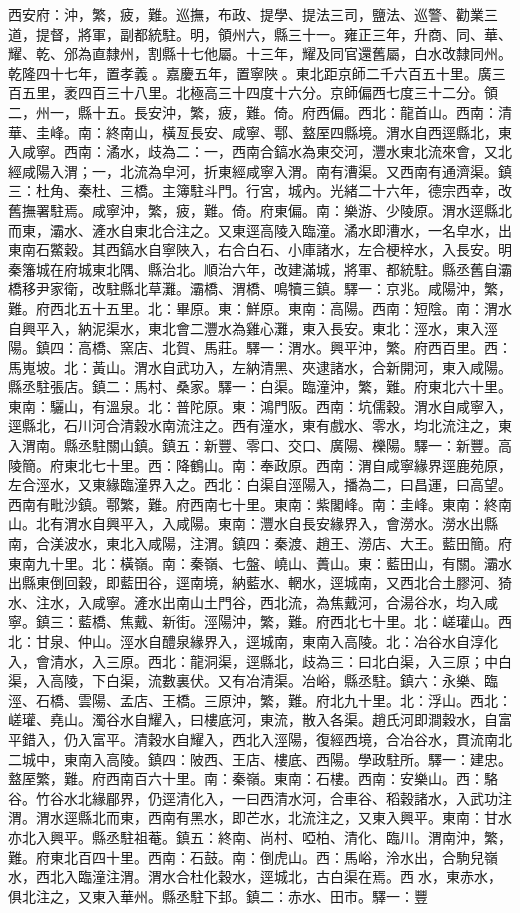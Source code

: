 \begin{pinyinscope}
西安府：沖，繁，疲，難。巡撫，布政、提學、提法三司，鹽法、巡警、勸業三道，提督，將軍，副都統駐。明，領州六，縣三十一。雍正三年，升商、同、華、耀、乾、邠為直隸州，割縣十七他屬。十三年，耀及同官還舊屬，白水改隸同州。乾隆四十七年，置孝義。嘉慶五年，置寧陜。東北距京師二千六百五十里。廣三百五里，袤四百三十八里。北極高三十四度十六分。京師偏西七度三十二分。領二，州一，縣十五。長安沖，繁，疲，難。倚。府西偏。西北：龍首山。西南：清華、圭峰。南：終南山，橫亙長安、咸寧、鄠、盩厔四縣境。渭水自西逕縣北，東入咸寧。西南：潏水，歧為二：一，西南合鎬水為東交河，灃水東北流來會，又北經咸陽入渭；一，北流為皁河，折東經咸寧入渭。南有漕渠。又西南有通濟渠。鎮三：杜角、秦杜、三橋。主簿駐斗門。行宮，城內。光緒二十六年，德宗西幸，改舊撫署駐焉。咸寧沖，繁，疲，難。倚。府東偏。南：樂游、少陵原。渭水逕縣北而東，灞水、滻水自東北合注之。又東逕高陵入臨潼。潏水即漕水，一名皁水，出東南石鱉穀。其西鎬水自寧陜入，右合白石、小庫諸水，左合梗梓水，入長安。明秦籓城在府城東北隅、縣治北。順治六年，改建滿城，將軍、都統駐。縣丞舊自灞橋移尹家衛，改駐縣北草灘。灞橋、渭橋、鳴犢三鎮。驛一：京兆。咸陽沖，繁，難。府西北五十五里。北：畢原。東：鮮原。東南：高陽。西南：短陰。南：渭水自興平入，納泥渠水，東北會二灃水為雞心灘，東入長安。東北：涇水，東入涇陽。鎮四：高橋、窯店、北賀、馬莊。驛一：渭水。興平沖，繁。府西百里。西：馬嵬坡。北：黃山。渭水自武功入，左納清黑、夾逮諸水，合新開河，東入咸陽。縣丞駐張店。鎮二：馬村、桑家。驛一：白渠。臨潼沖，繁，難。府東北六十里。東南：驪山，有溫泉。北：普陀原。東：鴻門阪。西南：坑儒穀。渭水自咸寧入，逕縣北，石川河合清穀水南流注之。西有潼水，東有戲水、零水，均北流注之，東入渭南。縣丞駐關山鎮。鎮五：新豐、零口、交口、廣陽、櫟陽。驛一：新豐。高陵簡。府東北七十里。西：降鶴山。南：奉政原。西南：渭自咸寧緣界逕鹿苑原，左合涇水，又東緣臨潼界入之。西北：白渠自涇陽入，播為二，曰昌運，曰高望。西南有毗沙鎮。鄠繁，難。府西南七十里。東南：紫閣峰。南：圭峰。東南：終南山。北有渭水自興平入，入咸陽。東南：灃水自長安緣界入，會澇水。澇水出縣南，合渼波水，東北入咸陽，注渭。鎮四：秦渡、趙王、澇店、大王。藍田簡。府東南九十里。北：橫嶺。南：秦嶺、七盤、嶢山、蕢山。東：藍田山，有關。灞水出縣東倒回穀，即藍田谷，逕南境，納藍水、輞水，逕城南，又西北合土膠河、猗水、注水，入咸寧。滻水出南山土門谷，西北流，為焦戴河，合湯谷水，均入咸寧。鎮三：藍橋、焦戴、新街。涇陽沖，繁，難。府西北七十里。北：嵯瓘山。西北：甘泉、仲山。涇水自醴泉緣界入，逕城南，東南入高陵。北：冶谷水自淳化入，會清水，入三原。西北：龍洞渠，逕縣北，歧為三：曰北白渠，入三原；中白渠，入高陵，下白渠，流數裏伏。又有冶清渠。冶峪，縣丞駐。鎮六：永樂、臨涇、石橋、雲陽、孟店、王橋。三原沖，繁，難。府北九十里。北：浮山。西北：嵯瓘、堯山。濁谷水自耀入，曰樓底河，東流，散入各渠。趙氏河即澗穀水，自富平錯入，仍入富平。清穀水自耀入，西北入涇陽，復經西境，合冶谷水，貫流南北二城中，東南入高陵。鎮四：陂西、王店、樓底、西陽。學政駐所。驛一：建忠。盩厔繁，難。府西南百六十里。南：秦嶺。東南：石樓。西南：安樂山。西：駱谷。竹谷水北緣郿界，仍逕清化入，一曰西清水河，合車谷、稻穀諸水，入武功注渭。渭水逕縣北而東，西南有黑水，即芒水，北流注之，又東入興平。東南：甘水亦北入興平。縣丞駐祖菴。鎮五：終南、尚村、啞柏、清化、臨川。渭南沖，繁，難。府東北百四十里。西南：石鼓。南：倒虎山。西：馬峪，泠水出，合駒兒嶺水，西北入臨潼注渭。渭水合杜化穀水，逕城北，古白渠在焉。西水，東赤水，俱北注之，又東入華州。縣丞駐下邽。鎮二：赤水、田市。驛一：豐
\end{pinyinscope}
